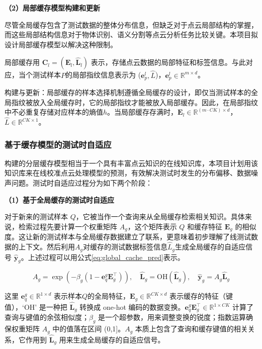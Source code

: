 \documentclass[12pt]{article}
\newcommand{\myEmph}[1]{\textbf{\textcolor[rgb]{0,0,0.25}{#1}}}
\begin{document}
\myEmph{（2）局部缓存模型构建和更新}

尽管全局缓存包含了测试数据的整体分布信息，但缺乏对于点云局部结构的掌握，而这些局部结构信息对于物体识别、语义分割等点云分析任务比较关键。本项目拟设计局部缓存模型以解决这种限制。

局部缓存用 $\textbf{C}_l = (\textbf{E}_l, \hat{\textbf{L}}_l)$ 表示，存储点云数据的局部特征和标签信息。与此对应，当个测试样本$P$的局部指纹信息表示为 ($\textbf{e}_p^l, \hat{L}$)，$\textbf{e}_p^l \in \mathbb{R}^{m\times d}$。

构建与更新：局部缓存的样本选择机制遵循全局缓存的设计，即仅当测试样本的全局指纹被放入全局缓存时，它的局部指纹才能被放入局部缓存。因此，在局部指纹中不必重复存储对应样本的熵值$h$。当局部缓存存满时，$\textbf{E}_l \in \mathbb{R}^{(m\cdot C K)\times d}$，$\hat{L} \in \mathbb{R}^{CK \times 1}$。

\subsubsection{基于缓存模型的测试时自适应}

构建的分层缓存模型相当于一个具有丰富点云知识的在线知识库，本项目计划用该知识库来在线校准点云处理模型的预测，有效解决测试时发生的分布偏移、数据噪声问题。测试时自适应过程分为如下两个阶段：

\myEmph{（1）基于全局缓存的测试时自适应}

对于新来的测试样本 $Q$，它被当作一个查询来从全局缓存检索相关知识。具体来说，检索过程先要计算一个权重矩阵 $A_g$，这个矩阵表示 $Q$ 和缓存特征 $\textbf{E}_g$ 的相似度。这让新的测试样本与全局缓存数据建立了联系，更意味着初步理解了线测试数据的上下文。然后利用$A_g$对缓存的测试数据标签信息$\hat{L}_g$生成全局缓存的自适应信号 $\hat{\textbf{y}}_g$。上述过程可以用公式\ref{eq:global_cache_pred}表示。

\begin{equation}
    A_g = \exp(-\beta_g(1 - \textbf{e}_q^g \textbf{E}_{g}^\top)),\quad \hat{\textbf{L}}_{g} = \textrm{OH}(\hat{\textbf{L}}_{g}),\quad \hat{\textbf{y}}_g =  A_{g} \hat{\textbf{L}}_{g}
    \label{eq:global_cache_pred}
\end{equation}

这里 $\textbf{e}_q^g \in \mathbb{R}^{1\times d}$ 表示样本$Q$的全局特征，$\textbf{E}_{g} \in \mathbb{R}^{CK\times d}$ 表示缓存的特征（键值），`OH' 是一种把 $\hat{\textbf{L}}_{g}$ 转换成 one-hot 编码的数据变换。$\textbf{e}_q^g \textbf{E}_{g}^\top \in \mathbb{R}^{1\times CK}$ 计算了查询与键值的余弦相似度；$\beta_g$ 是一个超参数，用来调整变换的锐度；指数运算确保权重矩阵 $A_g$ 中的值落在区间 (0,1]。$A_g$ 本质上包含了查询和缓存键值的相关关系，它作用到 $\hat{\textbf{L}}_{g}$ 用来生成全局缓存的自适应信号。
\end{document}
